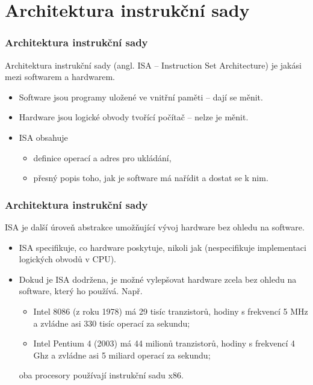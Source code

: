 \documentclass[aspectratio=169,11pt,svgnames,handout]{beamer}
\begin{document}
\section{Architektura instrukční sady}

\begin{frame}
 \frametitle{Architektura instrukční sady}
 Architektura instrukční sady (angl. \alert{ISA} -- Instruction Set
 Architecture) je jakási  mezi softwarem a hardwarem.\pause\\
 \begin{itemize}[label=\textbullet]
  \item \alert{Software} jsou programy uložené ve vnitřní paměti -- dají se
   měnit.\pause
  \item \alert{Hardware} jsou logické obvody tvořící počítač -- nelze je
   měnit.\pause
  \item \alert{ISA} obsahuje
  \begin{itemize}[label=\textemdash]
   \item definice \alert{operací} a \alert{adres pro ukládání},\pause
   \item \alert{přesný popis} toho, jak je software má \alert{nařídit} a
    \alert{dostat se k nim}.
  \end{itemize}
 \end{itemize}
\end{frame}

\begin{frame}
 \frametitle{Architektura instrukční sady}
 ISA je další úroveň abstrakce umožňující vývoj hardware \alert{bez ohledu na
 software}.\pause
 \begin{itemize}[label=\textbullet]
  \item ISA specifikuje, \alert{co} hardware poskytuje, nikoli \alert{jak}
   (nespecifikuje implementaci logických obvodů v CPU).\pause
  \item Dokud je ISA dodržena, je možné vylepšovat hardware zcela bez ohledu na
   software, který ho používá. Např.
  \begin{itemize}[label=\textemdash]
   \item Intel 8086 (z roku 1978) má 29 tisíc tranzistorů, hodiny s frekvencí 5
    MHz a zvládne asi 330 tisíc operací za sekundu;\pause 
   \item Intel Pentium 4 (2003) má 44 milionů tranzistorů, hodiny s frekvencí 4
    Ghz a zvládne asi 5 miliard operací za sekundu;\pause
  \end{itemize}
  oba procesory používají instrukční sadu x86.
 \end{itemize}
\end{frame}
\end{document}
